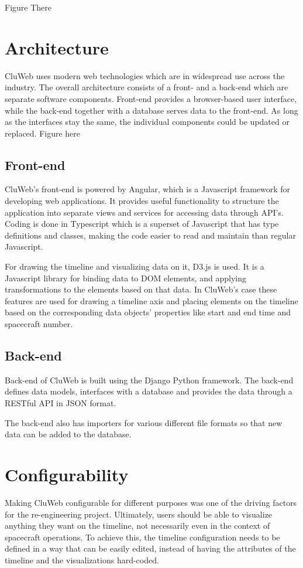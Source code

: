 Figure There

\section{Architecture}
CluWeb uses modern web technologies which are in widespread use across the industry. The overall architecture consists of a front- and a back-end which are separate software components. Front-end provides a browser-based user interface, while the back-end together with a database serves data to the front-end. As long as the interfaces stay the same, the individual components could be updated or replaced.
Figure here
\subsection{Front-end}
CluWeb's front-end is powered by Angular, which is a Javascript framework for developing web applications. It provides useful functionality to structure the application into separate views and services for accessing data through API's. Coding is done in Typescript which is a superset of Javascript that has type definitions and classes, making the code easier to read and maintain than regular Javascript.

For drawing the timeline and visualizing data on it, D3.js is used. It is a Javascript library for binding data to DOM elements, and applying transformations to the elements based on that data. In CluWeb's case these features are used for drawing a timeline axis and placing elements on the timeline based on the corresponding data objects' properties like start and end time and spacecraft number.

\subsection{Back-end}
Back-end of CluWeb is built using the Django Python framework. The back-end defines data models, interfaces with a database and provides the data through a RESTful API in JSON format.

The back-end also has importers for various different file formats so that new data can be added to the database. 

\section{Configurability}
Making CluWeb configurable for different purposes was one of the driving factors for the re-engineering project. Ultimately, users should be able to visualize anything they want on the timeline, not necessarily even in the context of spacecraft operations. To achieve this, the timeline configuration needs to be defined in a way that can be easily edited, instead of having the attributes of the timeline and the visualizations hard-coded.


